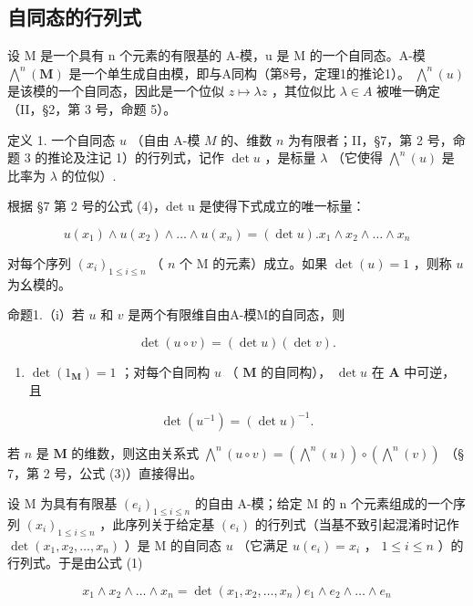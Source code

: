 \subsection{自同态的行列式}

设 M 是一个具有 n 个元素的有限基的 A-模，u 是 M 的一个自同态。A-模 \(\bigwedge^{n}(\mathbf{M})\) 是一个单生成自由模，即与A同构（第8号，定理1的推论1）。 \(\bigwedge^{n}(u)\) 是该模的一个自同态，因此是一个位似 \(z \mapsto \lambda z\) ，其位似比 \(\lambda \in A\) 被唯一确定（II，§2，第 3 号，命题 5）。

定义 1. 一个自同态 \(u\) （自由 A-模 \(M\) 的、维数 \(n\) 为有限者；II，§7，第 2 号，命题 3 的推论及注记 1）的行列式，记作 \(\det u\) ，是标量 \(\lambda\) （它使得 \(\bigwedge^{n}(u)\) 是比率为 \(\lambda\) 的位似）.

根据 §7 第 2 号的公式 (4)，det u 是使得下式成立的唯一标量：

\[
u \left(x _ {1}\right) \wedge u \left(x _ {2}\right) \wedge \dots \wedge u \left(x _ {n}\right) = (\det u). x _ {1} \wedge x _ {2} \wedge \dots \wedge x _ {n}\tag{1}
\]

对每个序列 \((x_{i})_{1\leqslant i\leqslant n}\) （ \(n\) 个 M 的元素）成立。如果 \(\det (u) = 1\) ，则称 \(u\) 为幺模的。

命题1.（i）若 \(u\) 和 \(v\) 是两个有限维自由A-模M的自同态，则

\[
\det (u \circ v) = (\det u) (\det v).\tag{2}
\]

\begin{enumerate}
\def\labelenumi{(\roman{enumi})}
\setcounter{enumi}{1}
\tightlist
\item
  \(\operatorname{det}(1_{\mathbf{M}}) = 1\) ；对每个自同构 \(u\) （ \(\mathbf{M}\) 的自同构）， \(\operatorname{det} u\) 在 \(\mathbf{A}\) 中可逆，且
\end{enumerate}

\[
\det (u ^ {- 1}) = (\det u) ^ {- 1}.\tag{3}
\]

若 \(n\) 是 \(\mathbf{M}\) 的维数，则这由关系式 \(\bigwedge^{n}(u \circ v) = (\bigwedge^{n}(u)) \circ (\bigwedge^{n}(v))\) （§ 7，第 2 号，公式 (3)）直接得出。

设 M 为具有有限基 \((e_{i})_{1\leqslant i\leqslant n}\) 的自由 A-模；给定 M 的 n 个元素组成的一个序列 \((x_{i})_{1\leqslant i\leqslant n}\) ，此序列关于给定基 \((e_i)\) 的行列式（当基不致引起混淆时记作 \(\det(x_1, x_2, \ldots, x_n)\) ）是 M 的自同态 \(u\) （它满足 \(u(e_i) = x_i\) ， \(1 \leqslant i \leqslant n\) ）的行列式。于是由公式 (1)

\[
x _ {1} \wedge x _ {2} \wedge \dots \wedge x _ {n} = \det (x _ {1}, x _ {2}, \dots , x _ {n}) e _ {1} \wedge e _ {2} \wedge \dots \wedge e _ {n}\tag{4}
\]

